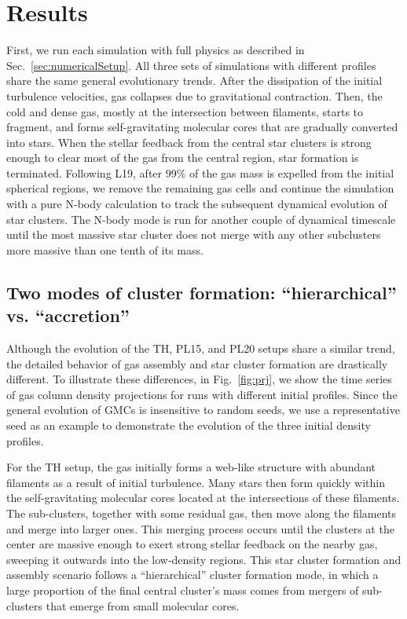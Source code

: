 \documentclass[fleqn,usenatbib]{mnras}
\begin{document}
\section{Results}
\label{sec:results}

First, we run each simulation with full physics as described in Sec.~\ref{sec:numericalSetup}.
All three sets of simulations with different profiles share the same general evolutionary trends.
After the dissipation of the initial turbulence velocities, gas collapses due to gravitational contraction.
Then, the cold and dense gas, mostly at the intersection between filaments, starts to fragment, and forms self-gravitating molecular cores that are gradually converted into stars.
When the stellar feedback from the central star clusters is strong enough to clear most of the gas from the central region, star formation is terminated.
Following L19, after $99\%$ of the gas mass is expelled from the initial spherical regions, we remove the remaining gas cells and continue the simulation with a pure N-body calculation to track the subsequent dynamical evolution of star clusters. 
The N-body mode is run for another couple of dynamical timescale until the most massive star cluster does not merge with any other subclusters more massive than one tenth of its mass. 

\subsection{Two modes of cluster formation: ``hierarchical'' vs. ``accretion''}
\label{sec:twoModes}

Although the evolution of the TH, PL15, and PL20 setups share a similar trend, the detailed behavior of gas assembly and star cluster formation are drastically different.
To illustrate these differences, in Fig.~\ref{fig:prj}, we show the time series of gas column density projections for runs with different initial profiles. Since the general evolution of GMCs is insensitive to random seeds, we use a representative seed as an example to demonstrate the evolution of the three initial density profiles.

For the TH setup, the gas initially forms a web-like structure with abundant filaments as a result of initial turbulence.
Many stars then form quickly within the self-gravitating molecular cores located at the intersections of these filaments.
The sub-clusters, together with some residual gas, then move along the filaments and merge into larger ones.
This merging process occurs until the clusters at the center are massive enough to exert strong stellar feedback on the nearby gas, sweeping it outwards into the low-density regions.
This star cluster formation and assembly scenario follows a  ``hierarchical'' cluster formation mode, in which a large proportion of the final central cluster's mass comes from mergers of sub-clusters that emerge from small molecular cores.
\end{document}
